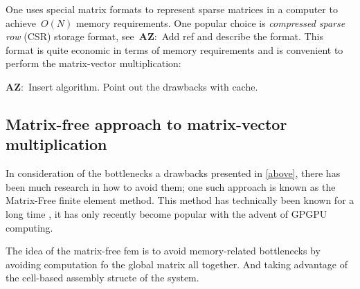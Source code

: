\documentclass[12pt]{article}
\newcommand{\AZ}[1]{{\color{red}\textbf{AZ}:~#1}}
\newcommand{\dimSize}{N}
\begin{document}
One uses special matrix formats to represent sparse matrices in a computer to achieve~$O(\dimSize)$ memory requirements. One popular choice is \textit{compressed sparse row} (CSR) storage format, see~\AZ{Add ref and describe the format.} This format is quite economic in terms of memory requirements and is convenient to perform the matrix-vector multiplication:

\AZ{Insert algorithm. Point out the drawbacks with cache.}

\subsection{Matrix-free approach to matrix-vector multiplication}

In consideration of the bottlenecks a drawbacks presented in \ref{above}, there has been much research in how to avoid them; one such approach is known as the Matrix-Free finite element method. This method has technically been known for a long time \cite{first paper}, it has only recently become popular with the advent of GPGPU computing\cite{recent papers}. 

The idea of the matrix-free fem is to avoid memory-related bottlenecks by avoiding computation fo the global matrix all together. And taking advantage of the cell-based assembly structe of the system. 
\end{document}
